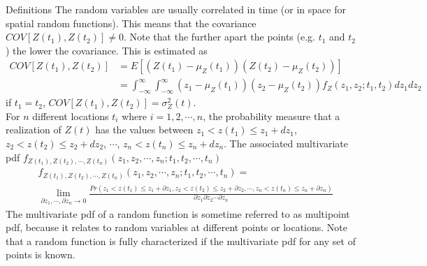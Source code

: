 \documentclass[8pt]{beamer}
\renewcommand{\emph}[1]{\textcolor{myorange}{#1}}
\begin{document}
\begin{frame}{Definitions}
    The \emph{random variables} are usually correlated in time (or in space for spatial random functions). This means that the \emph{covariance} $COV[Z(t_1), Z(t_2)] \neq 0$. Note that the  further apart the points (e.g. $t_1$ and $t_2$) the lower the \emph{covariance}. This is estimated as
    \begin{align*}
        COV[Z(t_1), Z(t_2)]  &= E[(Z(t_1)-\mu_Z (t_1))(Z(t_2)-\mu_Z (t_2))] \\
                             &= \int_{-\infty}^{\infty} \int_{-\infty}^{\infty} (z_1-\mu_{Z}(t_1)) (z_2-\mu_{Z}(t_2)) f_Z (z_1, z_2; t_1, t_2) dz_1 dz_2
    \end{align*}
    if $t_1 = t_2$, $COV[Z(t_1), Z(t_2)]  = \sigma_Z^2 (t)$. \\

    For $n$ different locations $t_i$ where $i=1, 2, \cdots, n$, the probability measure that a realization of $Z(t)$ has the values between $z_1 < z(t_1) \leq z_1 + dz_1$, $z_2 < z(t_2) \leq z_2 + dz_2$, $\cdots$, $z_n < z(t_n) \leq z_n + dz_n$. The \emph{associated multivariate pdf} $f_{Z(t_1), Z(t_2),\cdots,Z(t_n)} (z_1, z_2, \cdots, z_n; t_1, t_2, \cdots, t_n)$
    \begin{align*}
        &f_{Z(t_1), Z(t_2),\cdots,Z(t_n)} (z_1, z_2, \cdots, z_n; t_1, t_2, \cdots, t_n) = \\ 
                                                                                        &\lim_{\partial z_1, \cdots, \partial z_n \rightarrow 0} \frac{Pr(z_1 < z(t_1) \leq z_1 + \partial z_1, z_2 < z(t_2) \leq z_2 + \partial z_2, \cdots, z_n < z(t_n) \leq z_n + \partial z_n)}{\partial z_1 \partial z_2 \cdots \partial z_n}
    \end{align*}
    The \emph{multivariate pdf} of a \emph{random function} is sometime referred to as \alert{multipoint pdf}, because it relates to random variables at different points or locations. Note that a \emph{random function} is fully characterized if the \emph{multivariate pdf} for any set of points is known. 

\end{frame}

\end{document}

